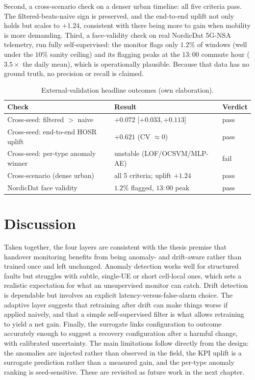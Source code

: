 Second, a cross-scenario check on a denser urban timeline: all five criteria
pass. The filtered-beats-naive sign is preserved, and the end-to-end uplift not
only holds but scales to $+1.24$, consistent with there being more to gain when
mobility is more demanding. Third, a face-validity check on real NordicDat
5G-NSA telemetry, run fully self-supervised: the monitor flags only $1.2\%$ of
windows (well under the $10\%$ sanity ceiling) and its flagging peaks at the
$13{:}00$ commute hour ($3.5\times$ the daily mean), which is operationally
plausible. Because that data has no ground truth, no precision or recall is
claimed.

\begin{table}[ht]
\centering
\caption{External-validation headline outcomes (own elaboration).}
\label{tab:external}
\begin{tabular}{@{}lll@{}}
\toprule
Check & Result & Verdict \\
\midrule
Cross-seed: filtered $>$ naive      & $+0.072$ [$+0.033,+0.113$] & pass \\
Cross-seed: end-to-end HOSR uplift  & $+0.621$ (CV $\approx 0$)  & pass \\
Cross-seed: per-type anomaly winner & unstable (LOF/OCSVM/MLP-AE) & fail \\
Cross-scenario (dense urban)        & all 5 criteria; uplift $+1.24$ & pass \\
NordicDat face validity             & $1.2\%$ flagged, $13{:}00$ peak & pass \\
\bottomrule
\end{tabular}
\end{table}

\section{Discussion}
\label{sec:res-discussion}

Taken together, the four layers are consistent with the thesis premise that
handover monitoring benefits from being anomaly- and drift-aware rather than
trained once and left unchanged. Anomaly detection works well for structured
faults but struggles with subtle, single-UE or short cell-local ones, which sets
a realistic expectation for what an unsupervised monitor can catch. Drift
detection is dependable but involves an explicit latency-versus-false-alarm
choice. The adaptive layer suggests that retraining after drift can make things
worse if applied naively, and that a simple self-supervised filter is what allows
retraining to yield a net gain. Finally, the surrogate links configuration to
outcome accurately enough to suggest a recovery configuration after a harmful
change, with calibrated uncertainty. The main
limitations follow directly from the design: the anomalies are injected rather
than observed in the field, the KPI uplift is a surrogate prediction rather than
a measured gain, and the per-type anomaly ranking is seed-sensitive. These are
revisited as future work in the next chapter.
